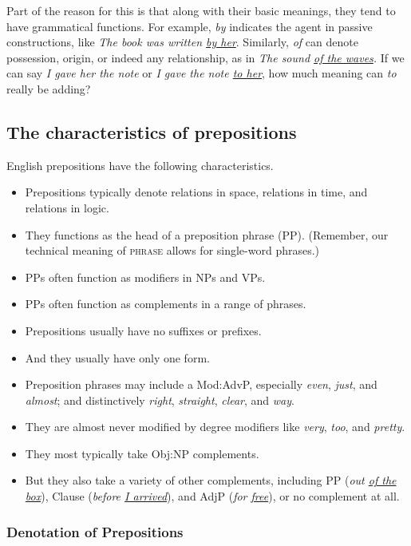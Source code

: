 Part of the reason for this is that along with their basic meanings, they tend to have grammatical functions. For example, \textit{by} indicates the agent in passive constructions, like \textit{The book was written \uline {by her}}. Similarly, \textit{of} can denote possession, origin, or indeed any relationship, as in \textit{The sound \uline {of the waves}.} If we can say \textit{I gave her the note} or \textit{I gave the note \uline {to her}}, how much meaning can \textit{to} really be adding?

\subsection{The characteristics of prepositions}\label{sec:preps}

English prepositions have the following characteristics.

\begin{itemize}
   \item Prepositions typically denote relations in space, relations in time, and relations in logic.
   \item They functions as the head of a preposition phrase (PP). (Remember, our technical meaning of \textsc{phrase} allows for single-word phrases.)
   \item PPs often function as modifiers in NPs and VPs.
   \item PPs often function as complements in a range of phrases.
   \item Prepositions usually have no suffixes or prefixes.
   \item And they usually have only one form.
   \item Preposition phrases may include a Mod:AdvP, especially \textit{even}, \textit{just}, and \textit{almost}; and distinctively \textit{right}, \textit{straight}, \textit{clear}, and \textit{way}.
   \item They are almost never modified by degree modifiers like \textit{very}, \textit{too}, and \textit{pretty}.
   \item They most typically take Obj:NP complements.
   \item But they also take a variety of other complements, including PP (\textit{out \uline{of the box}}), Clause (\textit{before \uline{I arrived}}), and AdjP (\textit{for \uline{free}}), or no complement at all.
\end{itemize}

\subsubsection*{Denotation of Prepositions}

